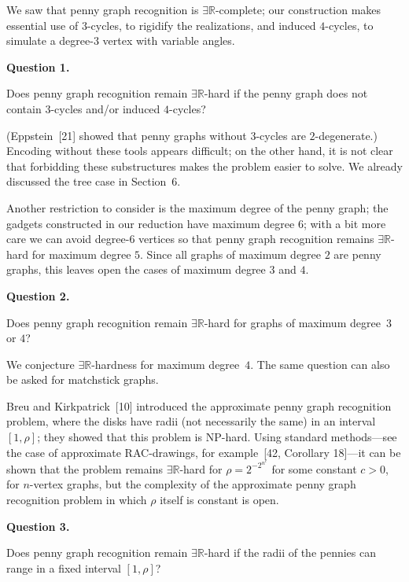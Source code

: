 \documentclass{article}
\begin{document}
We saw that penny graph recognition is \ensuremath{\exists\mathbb{R}}-complete; our construction makes essential use of $3$-cycles, to rigidify the realizations, and induced $4$-cycles, to simulate a degree-$3$ vertex with variable angles. 
\par\medskip\noindent\textbf{Question 1.} \begin{itshape}
    Does penny graph recognition remain \ensuremath{\exists\mathbb{R}}-hard if the penny graph does not contain $3$-cycles and/or induced $4$-cycles?
\end{itshape}\par\medskip 
(Eppstein~[21] showed that penny graphs without $3$-cycles are $2$-degenerate.) Encoding without these tools appears difficult; on the other hand, it is not clear that forbidding these substructures makes the problem easier to solve. We already discussed the tree case in Section~6.  

Another restriction to consider is the maximum degree of the penny graph; the gadgets constructed in our reduction have maximum degree $6$; with a bit more care we can avoid degree-$6$ vertices so that penny graph recognition remains \ensuremath{\exists\mathbb{R}}-hard for maximum degree $5$. Since all graphs of maximum degree $2$ are penny graphs, this leaves open the cases of maximum degree $3$ and $4$. 
\par\medskip\noindent\textbf{Question 2.} \begin{itshape}
    Does penny graph recognition remain \ensuremath{\exists\mathbb{R}}-hard for graphs of maximum degree~$3$ or $4$?
\end{itshape}\par\medskip
We conjecture \ensuremath{\exists\mathbb{R}}-hardness for maximum degree~$4$. The same question can also  be asked for matchstick graphs.

Breu and Kirkpatrick~[10] introduced the approximate penny graph recognition problem, where the disks have radii (not necessarily the same) in an interval $[1,\rho]$; they showed that this problem is \textsf{NP}-hard. Using standard methods---see the case of approximate \textnormal{\textsc{RAC}}-drawings, for example~[42, Corollary 18]---it can be shown that the problem remains \ensuremath{\exists\mathbb{R}}-hard for $\rho = 2^{-2^{n^c}}$ for some constant $c>0$, for $n$-vertex graphs, but the complexity of the approximate penny graph recognition problem in which $\rho$ itself is constant is open.

\par\medskip\noindent\textbf{Question 3.} \begin{itshape}
    Does penny graph recognition remain \ensuremath{\exists\mathbb{R}}-hard if the radii of the pennies can range in a fixed interval $[1,\rho]$?
\end{itshape}\par\medskip
\end{document}
